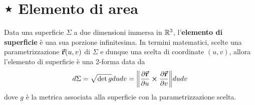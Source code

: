 \section{⋆ Elemento di area}
\begin{define}
Data una superficie	$\Sigma$ a due dimensioni immersa in $\mathbb{R}^3$, l'\textbf{elemento di superficie} è una sua porzione infinitesima. In termini matematici, scelte una parametrizzazione $\vb*{\va{r}}(u,v)$ di $\Sigma$ e dunque una scelta di coordinate $(u,v)$, allora l'elemento di superficie è una 2-forma data da
\begin{equation}
	d\Sigma=\sqrt{\det g}dudv=\norm{\pdv{\vb*{\va{r}}}{u}\cross\pdv{\vb*{\va{r}}}{v}}dudv
\end{equation}
dove $g$ è la metrica associata alla superficie con la parametrizzazione scelta.
\end{define}
\begin{comment}
\paragraph{Cambio di coordinate}
Data una parametrizzazione che mantiene l'\textit{orientazione} $\vba{r}\left(u,v\right)=\left(x(u,v),y(u,v),z(u,v)\right)$, la forma di superficie è
\begin{equation*}
	d\Sigma=\norm\pdv{\vba{r}}{u}\cross\pdv{\vba{r}}{v}dudv
\end{equation*}
Cambiando le coordinate da $(u,v)$ a $(s,t)$, la forma di superficie cambia con il determinante della Jacobiana:
\begin{equation*}
	d\Sigma=\abs{\pdv{\left(x,y,z\right)}{\left(u,v,s\right)}}dudvds
\end{equation*}
\end{comment}
